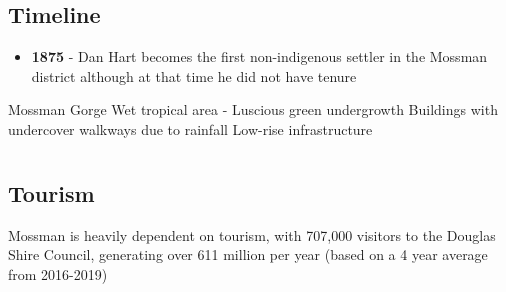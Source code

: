 	\subsection{Timeline}
	
		\begin{itemize}
			\item \textbf{1875} - Dan Hart becomes the first non-indigenous settler in the Mossman district although at that time he did not have tenure
		\end{itemize}


	Mossman Gorge
	Wet tropical area - Luscious green undergrowth
	Buildings with undercover walkways due to rainfall
	Low-rise infrastructure

\section{} \label{14/03/2025}

	\subsection{Tourism}
	
		Mossman is heavily dependent on tourism, with 707,000 visitors to the Douglas Shire Council, generating over 611 million per year (based on a 4 year average from 2016-2019)
